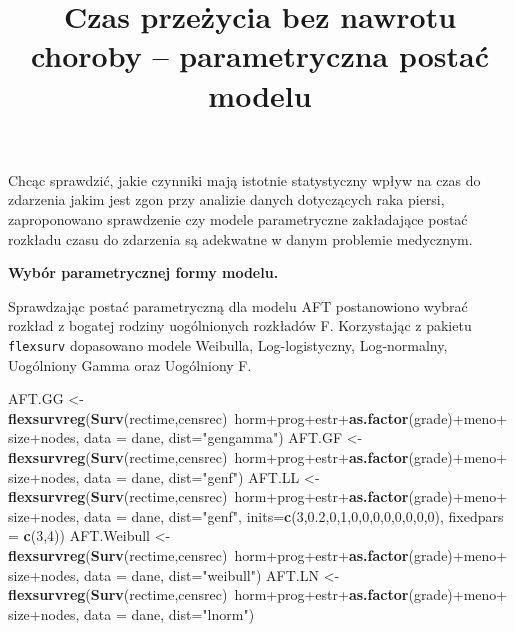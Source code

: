 \documentclass[]{article}
\title{Czas przeżycia bez nawrotu choroby -- parametryczna postać modelu}
\author{}
\date{}
\newenvironment{Shaded}{}{}
\newcommand{\KeywordTok}[1]{\textcolor[rgb]{0.00,0.44,0.13}{\textbf{{#1}}}}
\newcommand{\DataTypeTok}[1]{\textcolor[rgb]{0.56,0.13,0.00}{{#1}}}
\newcommand{\DecValTok}[1]{\textcolor[rgb]{0.25,0.63,0.44}{{#1}}}
\newcommand{\FloatTok}[1]{\textcolor[rgb]{0.25,0.63,0.44}{{#1}}}
\newcommand{\StringTok}[1]{\textcolor[rgb]{0.25,0.44,0.63}{{#1}}}
\newcommand{\NormalTok}[1]{{#1}}
\begin{document}
\maketitle


\thispagestyle{fancy}

Chcąc sprawdzić, jakie czynniki mają istotnie statystyczny wpływ na czas
do zdarzenia jakim jest zgon przy analizie danych dotyczących raka
piersi, zaproponowano sprawdzenie czy modele parametryczne zakładające
postać rozkładu czasu do zdarzenia są adekwatne w danym problemie
medycznym.

\textbf{Wybór parametrycznej formy modelu.}

Sprawdzając postać parametryczną dla modelu AFT postanowiono wybrać
rozkład z bogatej rodziny uogólnionych rozkładów F. Korzystając z
pakietu \texttt{flexsurv} dopasowano modele Weibulla, Log-logistyczny,
Log-normalny, Uogólniony Gamma oraz Uogólniony F.

\begin{Shaded}
\begin{Highlighting}[]
\NormalTok{AFT.GG <-}\StringTok{ }\KeywordTok{flexsurvreg}\NormalTok{(}\KeywordTok{Surv}\NormalTok{(rectime,censrec)~horm+prog+estr+}\KeywordTok{as.factor}\NormalTok{(grade)+meno+size+nodes, }
                             \DataTypeTok{data =} \NormalTok{dane, }\DataTypeTok{dist=}\StringTok{"gengamma"}\NormalTok{)}
\NormalTok{AFT.GF <-}\StringTok{ }\KeywordTok{flexsurvreg}\NormalTok{(}\KeywordTok{Surv}\NormalTok{(rectime,censrec)~horm+prog+estr+}\KeywordTok{as.factor}\NormalTok{(grade)+meno+size+nodes, }
                             \DataTypeTok{data =} \NormalTok{dane, }\DataTypeTok{dist=}\StringTok{"genf"}\NormalTok{)}
\NormalTok{AFT.LL <-}\StringTok{ }\KeywordTok{flexsurvreg}\NormalTok{(}\KeywordTok{Surv}\NormalTok{(rectime,censrec)~horm+prog+estr+}\KeywordTok{as.factor}\NormalTok{(grade)+meno+size+nodes, }
                             \DataTypeTok{data =} \NormalTok{dane, }\DataTypeTok{dist=}\StringTok{"genf"}\NormalTok{, }\DataTypeTok{inits=}\KeywordTok{c}\NormalTok{(}\DecValTok{3}\NormalTok{,}\FloatTok{0.2}\NormalTok{,}\DecValTok{0}\NormalTok{,}\DecValTok{1}\NormalTok{,}\DecValTok{0}\NormalTok{,}\DecValTok{0}\NormalTok{,}\DecValTok{0}\NormalTok{,}\DecValTok{0}\NormalTok{,}\DecValTok{0}\NormalTok{,}\DecValTok{0}\NormalTok{,}\DecValTok{0}\NormalTok{,}\DecValTok{0}\NormalTok{), }
                      \DataTypeTok{fixedpars =} \KeywordTok{c}\NormalTok{(}\DecValTok{3}\NormalTok{,}\DecValTok{4}\NormalTok{))}
\NormalTok{AFT.Weibull <-}\StringTok{ }\KeywordTok{flexsurvreg}\NormalTok{(}\KeywordTok{Surv}\NormalTok{(rectime,censrec)~horm+prog+estr+}\KeywordTok{as.factor}\NormalTok{(grade)+meno+size+nodes, }
                              \DataTypeTok{data =} \NormalTok{dane, }\DataTypeTok{dist=}\StringTok{"weibull"}\NormalTok{)}
\NormalTok{AFT.LN <-}\StringTok{ }\KeywordTok{flexsurvreg}\NormalTok{(}\KeywordTok{Surv}\NormalTok{(rectime,censrec)~horm+prog+estr+}\KeywordTok{as.factor}\NormalTok{(grade)+meno+size+nodes, }
                              \DataTypeTok{data =} \NormalTok{dane, }\DataTypeTok{dist=}\StringTok{"lnorm"}\NormalTok{)}
\end{Highlighting}
\end{Shaded}
\end{document}
